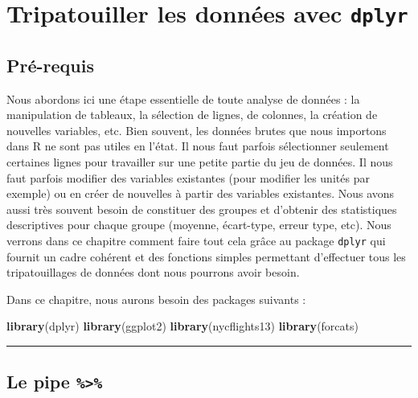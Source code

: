\documentclass[a4paperpaper,]{article}
\newenvironment{Shaded}{\begin{snugshade}}{\end{snugshade}}
\newcommand{\KeywordTok}[1]{\textcolor[rgb]{0.12,0.11,0.11}{\textbf{#1}}}
\newcommand{\NormalTok}[1]{\textcolor[rgb]{0.12,0.11,0.11}{#1}}
\begin{document}
\hypertarget{wrangling}{%
\section{\texorpdfstring{Tripatouiller les données avec \texttt{dplyr}}{Tripatouiller les données avec dplyr}}\label{wrangling}}

\hypertarget{pre-requis}{%
\subsection{Pré-requis}\label{pre-requis}}

Nous abordons ici une étape essentielle de toute analyse de données : la manipulation de tableaux, la sélection de lignes, de colonnes, la création de nouvelles variables, etc. Bien souvent, les données brutes que nous importons dans R ne sont pas utiles en l'état. Il nous faut parfois sélectionner seulement certaines lignes pour travailler sur une petite partie du jeu de données. Il nous faut parfois modifier des variables existantes (pour modifier les unités par exemple) ou en créer de nouvelles à partir des variables existantes. Nous avons aussi très souvent besoin de constituer des groupes et d'obtenir des statistiques descriptives pour chaque groupe (moyenne, écart-type, erreur type, etc). Nous verrons dans ce chapitre comment faire tout cela grâce au package \texttt{dplyr} qui fournit un cadre cohérent et des fonctions simples permettant d'effectuer tous les tripatouillages de données dont nous pourrons avoir besoin.

Dans ce chapitre, nous aurons besoin des packages suivants :

\begin{Shaded}
\begin{Highlighting}[]
\KeywordTok{library}\NormalTok{(dplyr)}
\KeywordTok{library}\NormalTok{(ggplot2)}
\KeywordTok{library}\NormalTok{(nycflights13)}
\KeywordTok{library}\NormalTok{(forcats)}
\end{Highlighting}
\end{Shaded}

\begin{center}\rule{0.5\linewidth}{\linethickness}\end{center}

\hypertarget{le-pipe}{%
\subsection{\texorpdfstring{Le pipe \texttt{\%\textgreater{}\%}}{Le pipe \%\textgreater{}\%}}\label{le-pipe}}
\end{document}
